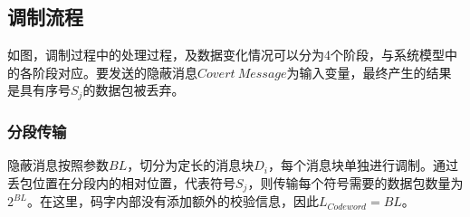 \subsection{调制流程}
\label{chap:zigzag:model:modulation}


如图，调制过程中的处理过程，及数据变化情况可以分为4个阶段，与系统模型中的各阶段对应。要发送的隐蔽消息$Covert\ Message$为输入变量，最终产生的结果是具有序号$S_{j}$的数据包被丢弃。

\subsubsection{分段传输}
\label{chap:zigzag:model:modulation:segment}
隐蔽消息按照参数$BL$，切分为定长的消息块$D_{i}$，每个消息块单独进行调制。通过丢包位置在分段内的相对位置，代表符号$S_{j}$，则传输每个符号需要的数据包数量为$2^{BL}$。在这里，码字内部没有添加额外的校验信息，因此$L_{Codeword}=BL$。


